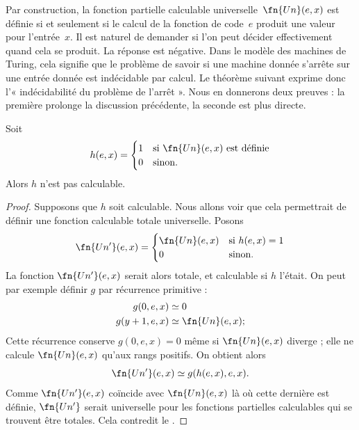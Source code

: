 \documentclass[../../../include/open-logic-section]{subfiles}
\begin{document}

Par construction, la fonction partielle calculable
universelle~$\fn{Un}(e,x)$ est définie si et
seulement si le calcul de la fonction de code~$e$
produit une valeur pour l'entrée~$x$. Il est
naturel de demander si l'on peut décider
effectivement quand cela se produit. La réponse
est négative. Dans le modèle des machines de
Turing, cela signifie que le problème de savoir
si une machine donnée s'arrête sur une entrée
donnée est indécidable par calcul. Le théorème
suivant exprime donc l'« indécidabilité du
problème de l'arrêt ». Nous en donnerons deux
preuves : la première prolonge la discussion
précédente, la seconde est plus directe.

\begin{thm}
Soit
\[
h(e, x)  =
\begin{cases}
1 & \text{si $\fn{Un}(e,x)$ est définie}\\
0 & \text{sinon.}
\end{cases}
\]
Alors $h$ n'est pas calculable.
\end{thm}

\begin{proof}
Supposons que $h$ soit calculable. Nous allons
voir que cela permettrait de définir une
fonction calculable totale universelle.
Posons
\[
\fn{Un'}(e,x) =
\begin{cases}
\fn{Un}(e,x) & \text{si $h(e,x)=1$}\\
0 & \text{sinon.}
\end{cases}
\]
La fonction $\fn{Un'}(e,x)$ serait alors totale,
et calculable si $h$ l'était. On peut par
exemple définir $g$ par récurrence primitive :
\begin{align*}
g(0, e, x) & \simeq 0 \\
g(y+1, e, x) & \simeq \fn{Un}(e,x);
\end{align*}
Cette récurrence conserve $g(0,e,x)=0$ même si $\fn{Un}(e,x)$ diverge ; elle ne calcule $\fn{Un}(e,x)$ qu'aux rangs positifs. On obtient alors
\[
\fn{Un'}(e,x) \simeq g(h(e,x),e,x).
\]
Comme $\fn{Un'}(e,x)$ coïncide avec
$\fn{Un}(e,x)$ là où cette dernière est
définie, $\fn{Un'}$ serait universelle
pour les fonctions partielles calculables
qui se trouvent être totales. Cela contredit le
.
\end{proof}
\end{document}
